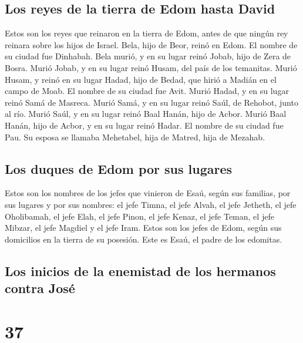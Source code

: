 \hypertarget{los-reyes-de-la-tierra-de-edom-hasta-david}{%
\subsection{Los reyes de la tierra de Edom hasta
David}\label{los-reyes-de-la-tierra-de-edom-hasta-david}}

 Estos son los reyes que reinaron en la tierra de Edom,
antes de que ningún rey reinara sobre los hijos de Israel.
 Bela, hijo de Beor, reinó en Edom. El nombre de su
ciudad fue Dinhabah.  Bela murió, y en su lugar reinó
Jobab, hijo de Zera de Bosra.  Murió Jobab, y en su lugar
reinó Husam, del país de los temanitas.  Murió Husam, y
reinó en su lugar Hadad, hijo de Bedad, que hirió a Madián en el campo
de Moab. El nombre de su ciudad fue Avit.  Murió Hadad, y
en su lugar reinó Samá de Masreca.  Murió Samá, y en su
lugar reinó Saúl, de Rehobot, junto al río.  Murió Saúl,
y en su lugar reinó Baal Hanán, hijo de Acbor.  Murió
Baal Hanán, hijo de Acbor, y en su lugar reinó Hadar. El nombre de su
ciudad fue Pau. Su esposa se llamaba Mehetabel, hija de Matred, hija de
Mezahab.

\hypertarget{los-duques-de-edom-por-sus-lugares}{%
\subsection{Los duques de Edom por sus
lugares}\label{los-duques-de-edom-por-sus-lugares}}

 Estos son los nombres de los jefes que vinieron de Esaú,
según sus familias, por sus lugares y por sus nombres: el jefe Timna, el
jefe Alvah, el jefe Jetheth,  el jefe Oholibamah, el jefe
Elah, el jefe Pinon,  el jefe Kenaz, el jefe Teman, el
jefe Mibzar,  el jefe Magdiel y el jefe Iram. Estos son
los jefes de Edom, según sus domicilios en la tierra de su posesión.
Este es Esaú, el padre de los edomitas.

\hypertarget{los-inicios-de-la-enemistad-de-los-hermanos-contra-josuxe9}{%
\subsection{Los inicios de la enemistad de los hermanos contra
José}\label{los-inicios-de-la-enemistad-de-los-hermanos-contra-josuxe9}}

\hypertarget{section-36}{%
\section{37}\label{section-36}}

